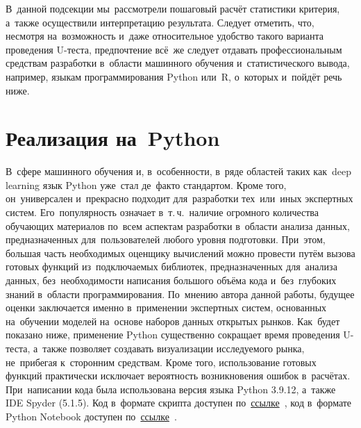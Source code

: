 \documentclass[]{scrreprt}
\begin{document}
В~данной подсекции мы~рассмотрели пошаговый расчёт статистики критерия, а~также осуществили интерпретацию результата. Следует отметить, что, несмотря на~возможность и~даже относительное удобство такого варианта проведения U-теста, предпочтение всё~же следует отдавать профессиональным средствам разработки в~области машинного обучения и~статистического вывода, например, языкам программирования Python или~R, о~которых и~пойдёт речь ниже.
%

\clearpage

\section{Реализация на~Python}\label{U-test-Python}
%
%
В~сфере машинного обучения и, в~особенности, в~ряде областей таких как~\foreignlanguage{english}{deep learning} язык Python уже~стал де~факто стандартом. Кроме того, он~универсален и~прекрасно подходит для~разработки тех~или~иных экспертных систем. Его~популярность означает в~т.\,ч.~наличие огромного количества обучающих материалов по~всем аспектам разработки в~области анализа данных, предназначенных для~пользователей любого уровня подготовки. При~этом, большая часть необходимых оценщику вычислений можно провести путём вызова готовых функций из~подключаемых библиотек, предназначенных для~анализа данных, без~необходимости написания большого объёма кода и~без~глубоких знаний в~области программирования. По~мнению автора данной работы, будущее оценки заключается именно в~применении экспертных систем, основанных на~обучении моделей на~основе наборов данных открытых рынков. Как~будет показано ниже, применение Python существенно сокращает время проведения U-теста, а~также позволяет создавать визуализации исследуемого рынка, не~прибегая к~сторонним средствам. Кроме того, использование готовых функций практически исключает вероятность возникновения ошибок в~расчётах. При~написании кода была использована версия языка Python 3.9.12, а~также IDE Spyder (5.1.5). Код в~формате скрипта доступен по~\href{https://github.com/Kirill-Murashev/AI_for_valuers_book/blob/main/Parts-Chapters/Mann-Whitney-Wilcoxon/U-test.py}{ссылке}~\cite{Murashev:U-test.py}, код в~формате \foreignlanguage{english}{Python Notebook}  доступен по~\href{https://github.com/Kirill-Murashev/AI_for_valuers_book/blob/main/Parts-Chapters/Mann-Whitney-Wilcoxon/U-test.ipynb}{ссылке}~\cite{Murashev:U-test.ipynb}.
\end{document}

